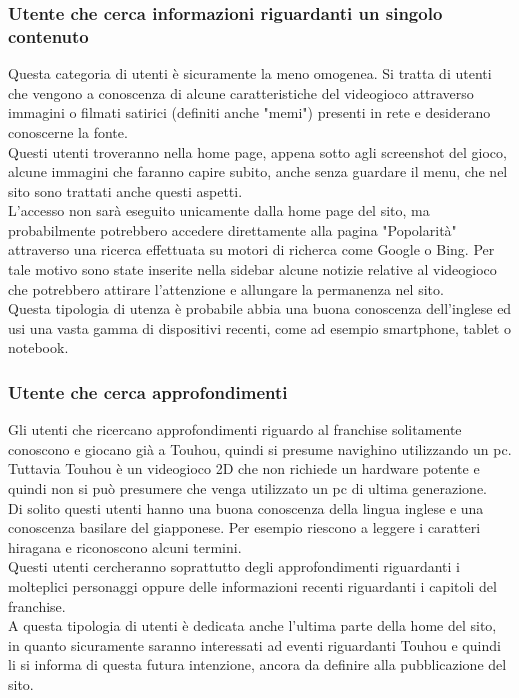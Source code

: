 \documentclass[openany, a4paper, 12pt]{report}
\begin{document}
		\subsubsection{Utente che cerca informazioni riguardanti un singolo contenuto}
		Questa categoria di utenti è sicuramente la meno omogenea. Si tratta di utenti che vengono a conoscenza di alcune caratteristiche del videogioco attraverso immagini o filmati satirici (definiti anche "memi") presenti in rete e desiderano conoscerne la fonte.\\
		Questi utenti troveranno nella home page, appena sotto agli screenshot del gioco, alcune immagini che faranno capire subito, anche senza guardare il menu, che nel sito sono trattati anche questi aspetti.\\
		L'accesso non sarà eseguito unicamente dalla home page del sito, ma probabilmente potrebbero accedere direttamente alla pagina "Popolarità" attraverso una ricerca effettuata su motori di richerca come Google o Bing. Per tale motivo sono state inserite nella sidebar alcune notizie relative al videogioco che potrebbero attirare l'attenzione e allungare la permanenza nel sito.\\
		Questa tipologia di utenza è probabile abbia una buona conoscenza dell'inglese ed usi una vasta gamma di dispositivi recenti, come ad esempio smartphone, tablet o notebook.\\
		\subsubsection{Utente che cerca approfondimenti}
		Gli utenti che ricercano approfondimenti riguardo al franchise solitamente conoscono e giocano già a Touhou, quindi si presume navighino utilizzando un pc. Tuttavia Touhou è un videogioco 2D che non richiede un hardware potente e quindi non si può presumere che venga utilizzato un pc di ultima generazione.\\
		Di solito questi utenti hanno una buona conoscenza della lingua inglese e una conoscenza basilare del giapponese. Per esempio riescono a leggere i caratteri hiragana e riconoscono alcuni termini.\\
		Questi utenti cercheranno soprattutto degli approfondimenti riguardanti i molteplici personaggi oppure delle informazioni recenti riguardanti i capitoli del franchise.\\
		A questa tipologia di utenti è dedicata anche l'ultima parte della home del sito, in quanto sicuramente saranno interessati ad eventi riguardanti Touhou e quindi li si informa di questa futura intenzione, ancora da definire alla pubblicazione del sito.
\end{document}
